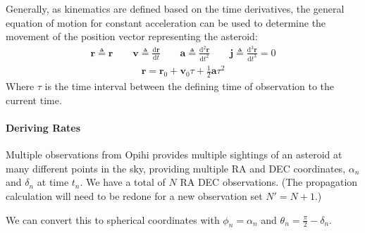 \documentclass[letterpaper,11pt,english]{sphinxmanual}
\begin{document}
\sphinxAtStartPar
Generally, as kinematics are defined based on the time derivatives, the general
equation of motion for constant acceleration can be used to determine the
movement of the position vector representing the asteroid:
\begin{equation*}
\begin{split}\mathbf{r} \triangleq \mathbf{r} \qquad \mathbf{v} \triangleq \frac{\mathrm{d}\mathbf{r}}{\mathrm{d}t} \qquad \mathbf{a} \triangleq \frac{\mathrm{d}^2\mathbf{r}}{\mathrm{d}t^2} \qquad \mathbf{j} \triangleq \frac{\mathrm{d}^3\mathbf{r}}{\mathrm{d}t^3} = 0\end{split}
\end{equation*}\begin{equation*}
\begin{split}\mathbf{r} = \mathbf{r}_0 + \mathbf{v}_0 \tau + \frac{1}{2} \mathbf{a} \tau^2\end{split}
\end{equation*}
\sphinxAtStartPar
Where \(\tau\) is the time interval between the defining time of
observation to the current time.


\paragraph{Deriving Rates}
\label{\detokenize{technical/algorithms/spherical_kinematics:deriving-rates}}
\sphinxAtStartPar
Multiple observations from Opihi provides multiple sightings of an asteroid at
many different points in the sky, providing multiple RA and DEC coordinates,
\(\alpha_n\) and \(\delta_n\) at time \(t_n\). We have a total of
\(N\) RA DEC observations. (The propagation calculation will need to be redone for
a new observation set \(N' = N + 1\).)

\sphinxAtStartPar
We can convert this to spherical coordinates with \(\phi_n = \alpha_n\) and \(\theta_n = \frac{\pi}{2} - \delta_n\).
\end{document}
